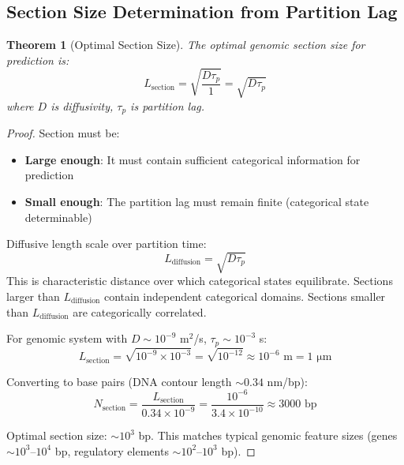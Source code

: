\documentclass[11pt,a4paper]{article}
\newtheorem{theorem}{Theorem}[section]
\theoremstyle{remark}
\begin{document}
\subsection{Section Size Determination from Partition Lag}

\begin{theorem}[Optimal Section Size]
\label{thm:optimal_section_size}
The optimal genomic section size for prediction is:
\begin{equation}
L_{\text{section}} = \sqrt{\frac{D\tau_p}{1}} = \sqrt{D\tau_p}
\end{equation}
where $D$ is diffusivity, $\tau_p$ is partition lag.
\end{theorem}

\begin{proof}
Section must be:
\begin{itemize}
\item \textbf{Large enough}: It must contain sufficient categorical information for prediction
\item \textbf{Small enough}: The partition lag must remain finite (categorical state determinable)
\end{itemize}

Diffusive length scale over partition time:
\begin{equation}
L_{\text{diffusion}} = \sqrt{D\tau_p}
\end{equation}
This is characteristic distance over which categorical states equilibrate. Sections larger than $L_{\text{diffusion}}$ contain independent categorical domains. Sections smaller than $L_{\text{diffusion}}$ are categorically correlated.

For genomic system with $D \sim 10^{-9}$ m$^2$/s, $\tau_p \sim 10^{-3}$ s:
\begin{equation}
L_{\text{section}} = \sqrt{10^{-9} \times 10^{-3}} = \sqrt{10^{-12}} \approx 10^{-6} \text{ m} = 1 \text{ μm}
\end{equation}

Converting to base pairs (DNA contour length $\sim 0.34$ nm/bp):
\begin{equation}
N_{\text{section}} = \frac{L_{\text{section}}}{0.34 \times 10^{-9}} = \frac{10^{-6}}{3.4 \times 10^{-10}} \approx 3000 \text{ bp}
\end{equation}

Optimal section size: $\sim 10^3$ bp. This matches typical genomic feature sizes (genes $\sim 10^3$--$10^4$ bp, regulatory elements $\sim 10^2$--$10^3$ bp).
\end{proof}
\end{document}
